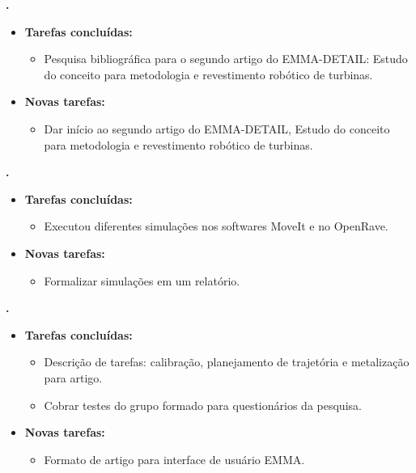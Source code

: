 	
	  \textbf{\elael.} 
	\begin{itemize}
		\item \textbf{Tarefas concluídas:}
			\begin{itemize}    
				\item Pesquisa bibliográfica para o segundo artigo do
				EMMA-DETAIL: Estudo do conceito para metodologia e revestimento robótico
de turbinas.
			\end{itemize}
		
		\item \textbf{Novas tarefas:}
			\begin{itemize} 
			    \item Dar início ao segundo artigo do EMMA-DETAIL, Estudo do conceito para metodologia e revestimento robótico
de turbinas.
			\end{itemize}
	\end{itemize}			
			
  \textbf{\renan.} 
	\begin{itemize}
		\item \textbf{Tarefas concluídas:}
			\begin{itemize}    
				\item Executou diferentes simulações nos softwares MoveIt e no OpenRave.
			\end{itemize}
		
		\item \textbf{Novas tarefas:}
			\begin{itemize} 
			    \item Formalizar simulações em um relatório.
			\end{itemize}
	\end{itemize}	
			
   \textbf{\julia.} 
	\begin{itemize}
		\item \textbf{Tarefas concluídas:}
			\begin{itemize}    
				\item Descrição de tarefas: calibração, planejamento de trajetória e metalização para artigo.
				\item Cobrar testes do grupo formado para questionários da pesquisa.
			\end{itemize}
		
		\item \textbf{Novas tarefas:}
			\begin{itemize} 
			    \item Formato de artigo para interface de usuário EMMA.
			\end{itemize}
	\end{itemize}		



